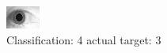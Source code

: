 \begin{figure}[h!]
\begin{center}
\includegraphics[width=0.60\columnwidth]{figures/ID1843_class_4_target_3.png}
\end{center}
\caption{ Classification: 4 actual target: 3}
\label{fig:ID1843_class_4_target_3}
\end{figure}
